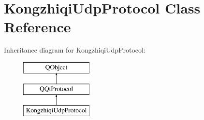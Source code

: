 \hypertarget{class_kongzhiqi_udp_protocol}{}\section{Kongzhiqi\+Udp\+Protocol Class Reference}
\label{class_kongzhiqi_udp_protocol}
Inheritance diagram for Kongzhiqi\+Udp\+Protocol\+:\begin{figure}[H]
\begin{center}
\leavevmode
\includegraphics[height=3.000000cm]{class_kongzhiqi_udp_protocol}
\end{center}
\end{figure}
